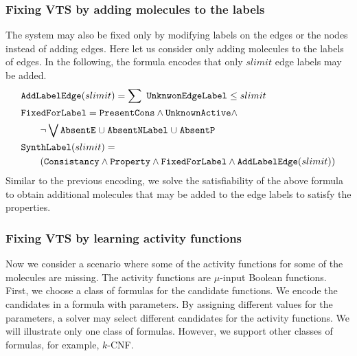 \subsubsection{Fixing VTS by adding molecules to the labels}
The system may also be fixed only by modifying labels on the edges or the nodes instead
of adding edges.
%
Here let us consider only adding molecules to the labels of edges.
%
In the following, the formula encodes that only $slimit$ edge labels may be added.
%
\begin{align*}
&\texttt{AddLabelEdge}(slimit) = 
\sum~\texttt{UnknwonEdgeLabel}  \leq slimit\\
& \texttt{FixedForLabel} = \texttt{PresentCons} \land \texttt{UnknownActive} \land\\
& \quad \quad \lnot \bigvee \texttt{AbsentE} \;{\cup}\;
\texttt{AbsentNLabel} \;{\cup}\;
\texttt{AbsentP}\\
&\texttt{SynthLabel}(slimit) = \\
& \quad\quad
(  \texttt{Consistancy}\land \texttt{Property} \land
\texttt{FixedForLabel} \land \texttt{AddLabelEdge}(slimit) )
\end{align*} 
%
Similar to the previous encoding, we solve the
satisfiability of the above formula to obtain additional molecules
that may be added to the edge labels to satisfy the properties.
%
\subsubsection{Fixing VTS by learning activity functions}
Now we consider a scenario where some of the activity functions for
some of the molecules are missing.
%
The activity functions are $\mu$-input Boolean functions.
%
First, we choose a class of formulas for the candidate functions.
%
We encode the candidates in a formula with parameters.
%
By assigning different values for the parameters, a solver may select
different candidates for the activity functions.
%
We will illustrate only one class of formulas.
%
However, we support other classes of formulas, for example, $k$-CNF.

